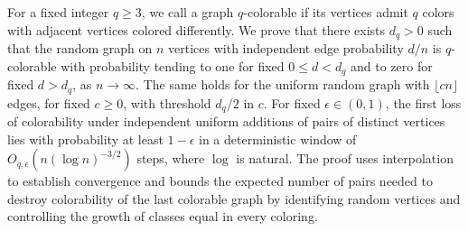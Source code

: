 For a fixed integer $q \ge 3$, we call a graph $q$-colorable if its vertices admit $q$ colors with adjacent vertices colored differently. We prove that there exists $d_q > 0$ such that the random graph on $n$ vertices with independent edge probability $d/n$ is $q$-colorable with probability tending to one for fixed $0 \le d < d_q$ and to zero for fixed $d > d_q$, as $n \to \infty$. The same holds for the uniform random graph with $\lfloor cn \rfloor$ edges, for fixed $c \ge 0$, with threshold $d_q/2$ in $c$. For fixed $\epsilon \in (0, 1)$, the first loss of colorability under independent uniform additions of pairs of distinct vertices lies with probability at least $1 - \epsilon$ in a deterministic window of $O_{q, \epsilon}(n(\log n)^{-3/2})$ steps, where $\log$ is natural. The proof uses interpolation to establish convergence and bounds the expected number of pairs needed to destroy colorability of the last colorable graph by identifying random vertices and controlling the growth of classes equal in every coloring.
